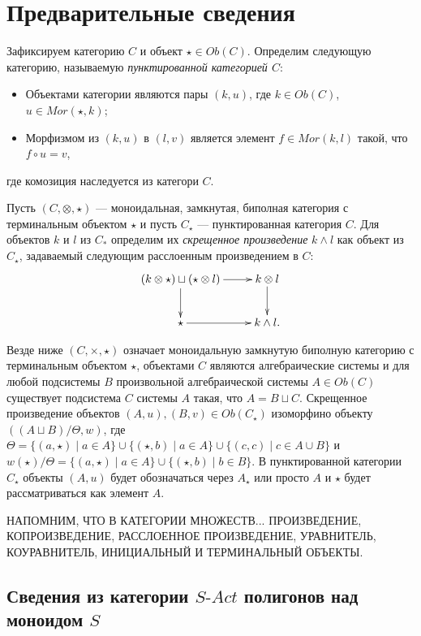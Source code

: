 \documentclass[a4paper,12pt]{article}
\newcommand{\SAct}{S\text{-}Act}
\begin{document}
\section*{Предварительные сведения}

Зафиксируем категорию $C$ и объект $\star \in Ob(C)$. Определим следующую категорию, называемую \textit{пунктированной категорией $C$}:
\begin{itemize}
    \item Объектами категории являются пары $(k,u)$, где $k \in Ob(C)$, $u \in Mor(\star,k)$;
    \item Морфизмом из $(k,u)$ в $(l,v)$ является элемент $f \in Mor(k,l)$ такой, что $f \circ u = v$,
\end{itemize}
где комозиция наследуется из категори $C$.

Пусть $(C,\otimes,\star)$ --- моноидальная, замкнутая, биполная категория с терминальным объектом $\star$ и пусть $C_\star$ --- пунктированная категория $C$. Для объектов $k$ и $l$ из $C_*$ определим их \textit{скрещенное произведение} $k \wedge l$ как объект из $C_\star$, задаваемый следующим расслоенным произведением в $C$:
$$\xymatrix{
    (k \otimes \star) \sqcup (\star \otimes l) \ar[r] \ar[d] & k \otimes l \ar[d]\\
    \star \ar[r] & k \wedge l.
}$$

Везде ниже $(C,\times,\star)$ означает моноидальную замкнутую биполную категорию с терминальным объектом $\star$, объектами $C$ являются алгебраические системы и для любой подсистемы $B$ произвольной алгебраической системы $A \in Ob(C)$ существует подсистема $C$ системы $A$ такая, что $A = B \sqcup C$. Скрещенное произведение объектов $(A,u), (B,v) \in Ob(C_\star)$ изоморфино объекту $((A \sqcup B)/\Theta, w)$, где $\Theta = \{(a,\star) \mid a \in A\} \cup \{(\star,b) \mid a \in A\} \cup \{(c,c) \mid c \in A \cup B\}$ и $w(\star)/\Theta = \{(a,\star) \mid a \in A\} \cup \{(\star,b) \mid b \in B\}$. В пунктированной категории $C_\star$ объекты $(A,u)$ будет обозначаться через $A_\star$ или просто $A$ и $\star$ будет рассматриваться как элемент $A$.

НАПОМНИМ, ЧТО В КАТЕГОРИИ МНОЖЕСТВ... ПРОИЗВЕДЕНИЕ, КОПРОИЗВЕДЕНИЕ, РАССЛОЕННОЕ ПРОИЗВЕДЕНИЕ, УРАВНИТЕЛЬ, КОУРАВНИТЕЛЬ, ИНИЦИАЛЬНЫЙ И ТЕРМИНАЛЬНЫЙ ОБЪЕКТЫ.

\subsection*{Сведения из категории $\SAct$ полигонов над моноидом $S$}
\end{document}

